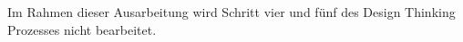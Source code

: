 Im Rahmen dieser Ausarbeitung wird Schritt vier und fünf des Design Thinking Prozesses nicht bearbeitet.